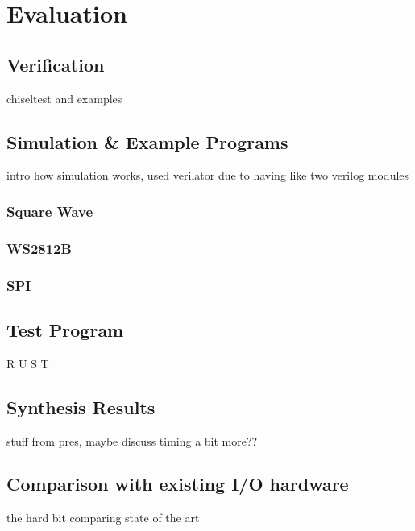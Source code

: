 \chapter{Evaluation}
\label{ch:evaluation}
\section{Verification}
chiseltest and examples
\section{Simulation \& Example Programs}
intro how simulation works, used verilator due to having like two verilog modules
\subsection{Square Wave}
\subsection{WS2812B}
\subsection{SPI}
\section{Test Program}
R U S T
\section{Synthesis Results}
stuff from pres, maybe discuss timing a bit more??

\section{Comparison with existing I/O hardware}
the hard bit comparing state of the art
